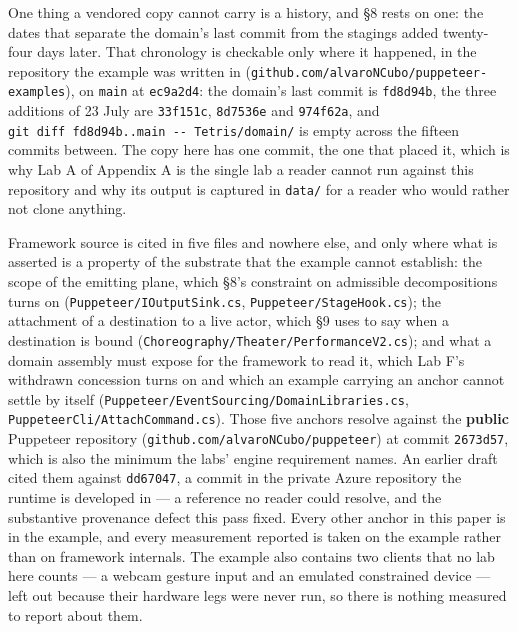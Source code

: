 \documentclass[
]{article}
\begin{document}
One thing a vendored copy cannot carry is a history, and §8 rests on
one: the dates that separate the domain's last commit from the stagings
added twenty-four days later. That chronology is checkable only where it
happened, in the repository the example was written in
(\texttt{github.com/alvaroNCubo/puppeteer-examples}), on \texttt{main}
at \texttt{ec9a2d4}: the domain's last commit is \texttt{fd8d94b}, the
three additions of 23 July are \texttt{33f151c}, \texttt{8d7536e} and
\texttt{974f62a}, and
\texttt{git\ diff\ fd8d94b..main\ -\/-\ Tetris/domain/} is empty across
the fifteen commits between. The copy here has one commit, the one that
placed it, which is why Lab A of Appendix A is the single lab a reader
cannot run against this repository and why its output is captured in
\texttt{data/} for a reader who would rather not clone anything.

Framework source is cited in five files and nowhere else, and only where
what is asserted is a property of the substrate that the example cannot
establish: the scope of the emitting plane, which §8's constraint on
admissible decompositions turns on (\texttt{Puppeteer/IOutputSink.cs},
\texttt{Puppeteer/StageHook.cs}); the attachment of a destination to a
live actor, which §9 uses to say when a destination is bound
(\texttt{Choreography/Theater/PerformanceV2.cs}); and what a domain
assembly must expose for the framework to read it, which Lab F's
withdrawn concession turns on and which an example carrying an anchor
cannot settle by itself
(\texttt{Puppeteer/EventSourcing/DomainLibraries.cs},
\texttt{PuppeteerCli/AttachCommand.cs}). Those five anchors resolve
against the \textbf{public} Puppeteer repository
(\texttt{github.com/alvaroNCubo/puppeteer}) at commit \texttt{2673d57},
which is also the minimum the labs' engine requirement names. An earlier
draft cited them against \texttt{dd67047}, a commit in the private Azure
repository the runtime is developed in --- a reference no reader could
resolve, and the substantive provenance defect this pass fixed. Every
other anchor in this paper is in the example, and every measurement
reported is taken on the example rather than on framework internals. The
example also contains two clients that no lab here counts --- a webcam
gesture input and an emulated constrained device --- left out because
their hardware legs were never run, so there is nothing measured to
report about them.
\end{document}
